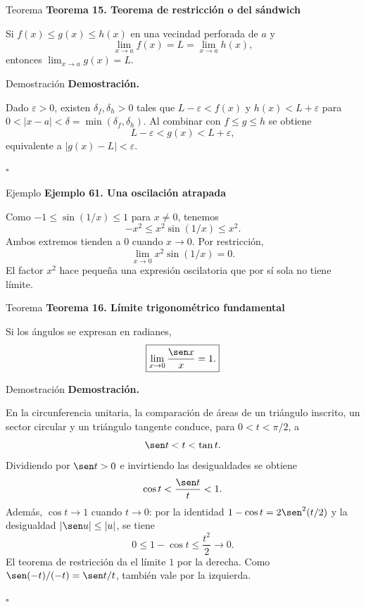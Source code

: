 \documentclass[12pt,aspectratio=169]{beamer}
\begin{document}
\begin{frame}[t,allowframebreaks]{Teorema}
{\color{azul}\bfseries Teorema 15. Teorema de restricción o del sándwich}\par\medskip

Si $f(x)\le g(x)\le h(x)$ en una vecindad perforada de $a$ y
\[
 \lim_{x\to a}f(x)=L=\lim_{x\to a}h(x),
\]
entonces $\lim_{x\to a}g(x)=L$.
\end{frame}


\begin{frame}[t,allowframebreaks]{Demostración}
{\color{azul}\bfseries Demostración.}\par\smallskip

Dado $\varepsilon>0$, existen $\delta_f,\delta_h>0$ tales que $L-\varepsilon<f(x)$ y $h(x)<L+\varepsilon$ para $0<|x-a|<\delta=\min(\delta_f,\delta_h)$. Al combinar con $f\le g\le h$ se obtiene
\[
 L-\varepsilon<g(x)<L+\varepsilon,
\]
equivalente a $|g(x)-L|<\varepsilon$.

\hfill $\square$
\end{frame}


\begin{frame}[t,allowframebreaks]{Ejemplo}
{\color{azul}\bfseries Ejemplo 61. Una oscilación atrapada}\par\medskip

Como $-1\le\sin(1/x)\le1$ para $x\ne0$, tenemos
\[
 -x^2\le x^2\sin(1/x)\le x^2.
\]
Ambos extremos tienden a $0$ cuando $x\to0$. Por restricción,
\[
 \boxed{\lim_{x\to0}x^2\sin(1/x)=0.}
\]
El factor $x^2$ hace pequeña una expresión oscilatoria que por sí sola no tiene límite.
\end{frame}


\begin{frame}[t,allowframebreaks]{Teorema}
{\color{azul}\bfseries Teorema 16. Límite trigonométrico fundamental}\par\medskip

Si los ángulos se expresan en radianes,
\[
 \boxed{\lim_{x\to0}\frac{\sen x}{x}=1.}
\]
\end{frame}


\begin{frame}[t,allowframebreaks]{Demostración}
{\color{azul}\bfseries Demostración.}\par\smallskip

En la circunferencia unitaria, la comparación de áreas de un triángulo inscrito, un sector circular y un triángulo tangente conduce, para $0<t<\pi/2$, a
\[
 \sen t<t<\tan t.
\]
Dividiendo por $\sen t>0$ e invirtiendo las desigualdades se obtiene
\[
 \cos t<\frac{\sen t}{t}<1.
\]
Además, $\cos t\to1$ cuando $t\to0$: por la identidad $1-\cos t=2\sen^2(t/2)$ y la desigualdad $|\sen u|\le|u|$, se tiene
\[
 0\le1-\cos t\le\frac{t^2}{2}\to0.
\]
El teorema de restricción da el límite $1$ por la derecha. Como $\sen(-t)/(-t)=\sen t/t$, también vale por la izquierda.

\hfill $\square$
\end{frame}
\end{document}
